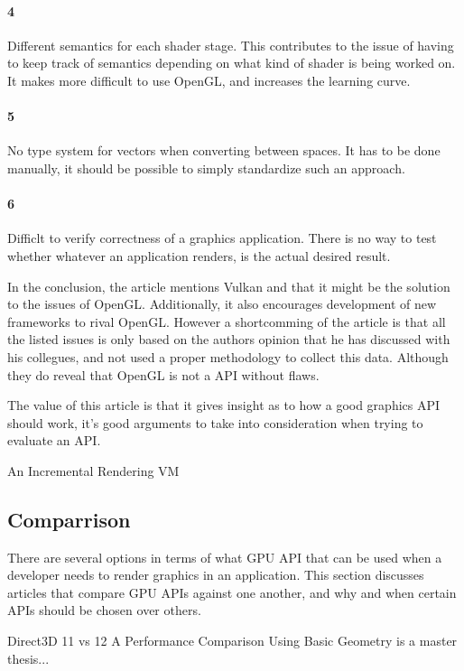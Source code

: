 \paragraph{4} Different semantics for each shader stage. 
This contributes to the issue of having to keep track of semantics depending on what kind of shader is being worked on.
It makes more difficult to use OpenGL, and increases the learning curve.

\paragraph{5} No type system for vectors when converting between spaces. 
It has to be done manually, it should be possible to simply standardize such an approach.

\paragraph{6} Difficlt to verify correctness of a graphics application. 
There is no way to test whether whatever an application renders, is the actual desired result.

In the conclusion, the article mentions Vulkan and that it might be the solution to the issues of OpenGL. 
Additionally, it also encourages development of new frameworks to rival OpenGL. 
However a shortcomming of the article is that all the listed issues is only based on the authors opinion that he has discussed with his collegues, and not used a proper methodology to collect this data. 
Although they do reveal that OpenGL is not a API without flaws.

The value of this article is that it gives insight as to how a good graphics \gls{API} should work, it's good arguments to take into consideration when trying to evaluate an \gls{API}.

An Incremental Rendering VM \cite{haaser_2015_incremental} 

\subsection{Comparrison}
There are several options in terms of what \gls{GPU} \gls{API} that can be used when a developer needs to render graphics in an application. This section discusses articles that compare \gls{GPU} \glspl{API} against one another, and why and when certain \glspl{API} should be chosen over others.

Direct3D 11 vs 12 A Performance Comparison Using Basic Geometry \cite{2016_direct3d} is a master thesis...

